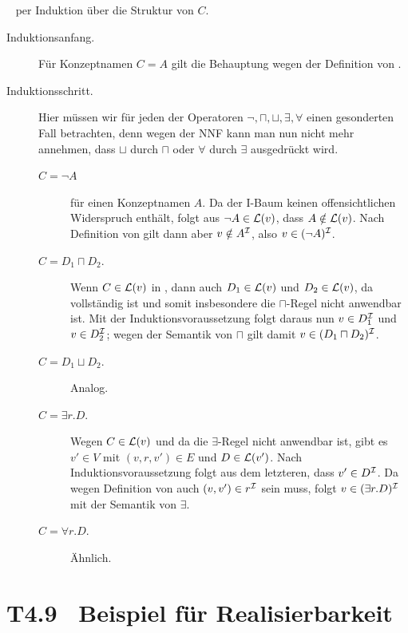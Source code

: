 \documentclass[fontsize=11pt, twoside=false, numbers=autoenddot]{scrbook}
\begin{document}
\par\medskip
{}~
per Induktion über die Struktur von $C$.
%
\begin{description}
  \item[Induktionsanfang.]
    Für Konzeptnamen $C=A$ gilt die Behauptung wegen der Definition von \Imc.
  \item[Induktionsschritt.]
    Hier müssen wir für jeden der Operatoren $\lnot,\sqcap,\sqcup,\exists,\forall$
    einen gesonderten Fall betrachten, denn wegen der NNF kann man nun
    nicht mehr annehmen, dass $\sqcup$ durch $\sqcap$ oder $\forall$ durch $\exists$
    ausgedrückt wird.
    \begin{description}
      \item[{\boldmath $C = \lnot A$}]
        für einen Konzeptnamen $A$.
        Da der I-Baum \Bmc keinen offensichtlichen Widerspruch enthält,
        folgt aus $\lnot A \in \mathcal{L}(v)$,
        dass $A \notin \mathcal{L}(v)$.
        Nach Definition von \Imc gilt dann aber $v \notin A^\mathcal{I}$,
        also $v \in (\lnot A)^\mathcal{I}$.
      \item[{\boldmath $C = D_1 \sqcap D_2$.}]
        Wenn $C \in \mathcal{L}(v)$ in \Bmc,
        dann auch $D_1 \in \mathcal{L}(v)$
        und $D_2 \in \mathcal{L}(v)$,
        da \Bmc vollständig ist und somit insbesondere die
        $\sqcap$-Regel nicht anwendbar ist.
        Mit der Induktionsvoraussetzung folgt daraus nun $v \in D_1^\mathcal{I}$ und $v \in D_2^\mathcal{I}$;
        wegen der Semantik von $\sqcap$ gilt damit $v \in (D_1 \sqcap D_2)^\mathcal{I}$.
      \item[{\boldmath $C = D_1 \sqcup D_2$.}]
        Analog.
      \item[{\boldmath $C = \exists r.D$.}]
        Wegen $C \in \mathcal{L}(v)$
        und da die $\exists$-Regel nicht anwendbar ist,
        gibt es $v' \in V$ mit $(v,r,v') \in E$ und $D \in \mathcal{L}(v')$.
        Nach Induktionsvoraussetzung folgt aus dem letzteren,
        dass $v' \in D^\mathcal{I}$.
        Da wegen Definition von \Imc auch $(v,v') \in r^\mathcal{I}$ sein muss,
        folgt $v \in (\exists r.D)^\mathcal{I}$ mit der Semantik von $\exists$.
      \item[{\boldmath $C = \forall r.D$.}]
        Ähnlich.
        \qedhere
    \end{description}
\end{description}

\goodbreak

\section*{T4.9~ Beispiel für Realisierbarkeit}
\end{document}
